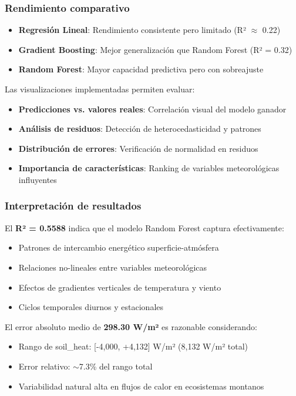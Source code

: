 \subsubsection{Rendimiento comparativo}
\begin{itemize}
    \item \textbf{Regresión Lineal}: Rendimiento consistente pero limitado (R² $\approx$ 0.22)
    \item \textbf{Gradient Boosting}: Mejor generalización que Random Forest (R² = 0.32)
    \item \textbf{Random Forest}: Mayor capacidad predictiva pero con sobreajuste
\end{itemize}

Las visualizaciones implementadas permiten evaluar:
\begin{itemize}
    \item \textbf{Predicciones vs. valores reales}: Correlación visual del modelo ganador
    \item \textbf{Análisis de residuos}: Detección de heterocedasticidad y patrones
    \item \textbf{Distribución de errores}: Verificación de normalidad en residuos
    \item \textbf{Importancia de características}: Ranking de variables meteorológicas influyentes
\end{itemize}

\subsubsection{Interpretación de resultados}
El \textbf{R² = 0.5588} indica que el modelo Random Forest captura efectivamente:
\begin{itemize}
    \item Patrones de intercambio energético superficie-atmósfera
    \item Relaciones no-lineales entre variables meteorológicas
    \item Efectos de gradientes verticales de temperatura y viento
    \item Ciclos temporales diurnos y estacionales
\end{itemize}

El error absoluto medio de \textbf{298.30 W/m²} es razonable considerando:
\begin{itemize}
    \item Rango de soil\_heat: [-4,000, +4,132] W/m² (8,132 W/m² total)
    \item Error relativo: $\sim$7.3\% del rango total
    \item Variabilidad natural alta en flujos de calor en ecosistemas montanos
\end{itemize}

